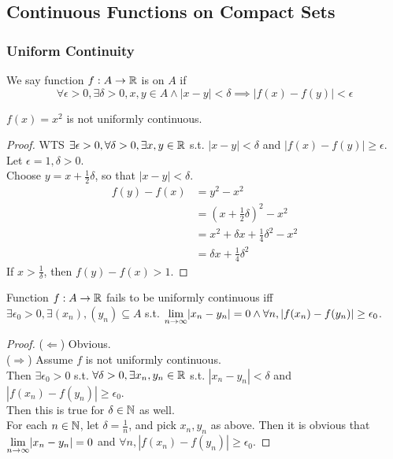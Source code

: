 \documentclass[11pt]{article}
\begin{document}
\subsection{Continuous Functions on Compact Sets}
\subsubsection{Uniform Continuity}
We say function $f: A \rightarrow \mathbb{R}$ is  on $A$ if 
$$\forall \epsilon > 0, \exists \delta > 0, x, y \in A \land |x - y| < \delta \implies |f(x) - f(y)| < \epsilon$$

\example $f(x) = x^2$ is not uniformly continuous.
\begin{proof}
	WTS $\exists \epsilon > 0, \forall \delta > 0, \exists x, y \in \mathbb{R}$ s.t. $|x - y| < \delta $ and $|f(x) - f(y)|  \geq \epsilon$.\\
	Let $\epsilon = 1, \delta > 0$. \\
	Choose $y = x + \frac{1}{2}\delta$, so that $|x - y| < \delta$. \\
	\begin{align*}
		f(y) - f(x) &= y^2 - x^2 \\
		&= (x + \frac{1}{2}\delta)^2 - x^2 \\
		&= x^2 + \delta x + \frac{1}{4}\delta^2 - x^2 \\
		&= \delta x + \frac{1}{4}\delta^2
	\end{align*} 
	If $x > \frac{1}{\delta}$, then $f(y) - f(x) > 1$.
\end{proof}

\property[\label{fails to be uniformly continuous iff}]
Function  $f: A \rightarrow \mathbb{R}$ fails to be uniformly continuous iff 
$\exists \epsilon_0 > 0, \exists (x_n), (y_n) \subseteq A$ s.t. $\underset{n \rightarrow \infty}{\lim} |x_n - y_n| = 0 \land \forall n, |f(x_n) - f(y_n)| \geq \epsilon_0$.
\begin{proof} 
($\Leftarrow$) Obvious.\\
($\Rightarrow$) Assume $f$ is not uniformly continuous. \\
Then $\exists \epsilon_0 > 0$ s.t. $\forall \delta > 0, \exists x_n, y_n \in \mathbb{R}$ s.t. $|x_n - y_n| < \delta$ and $|f(x_n) - f(y_n)| \geq \epsilon_0$.\\
Then this is true for $\delta \in \mathbb{N}$ as well. \\
For each $n \in \mathbb{N}$, let $\delta = \frac{1}{n}$, and pick $x_n, y_n$ as above. Then it is obvious that $\underset{n \rightarrow \infty}{\lim} |x_n - y_n| = 0$ and $\forall n, |f(x_n) - f(y_n)| \geq \epsilon_0$.
\end{proof}
\end{document}
